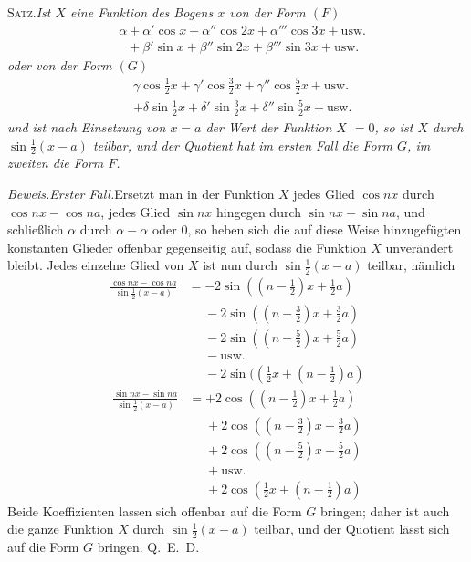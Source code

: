 \begingroup
\renewcommand{\arraystretch}{1.45}
\textsc{Satz.}\quad\textit{Ist $X$ eine Funktion des Bogens $x$ von der Form $(F)$}
\[
\begin{aligned}
&\alpha+\alpha'\cos x+\alpha''\cos 2x+\alpha'''\cos 3x+\text{usw.}\\[5pt]
&\phantom{\alpha}+\beta'\sin x+\beta''\sin 2x+\beta'''\sin 3x+\text{usw.}
\end{aligned}
\]
\textit{oder von der Form $(G)$}
\[
\begin{aligned}
&\gamma\cos\tfrac12x+\gamma'\cos\tfrac32x+\gamma''\cos\tfrac52x+\text{usw.}\\[5pt]
&+\delta\sin\tfrac12x+\delta'\sin\tfrac32x+\delta''\sin\tfrac52x+\text{usw.}
\end{aligned}
\]
\textit{und ist nach Einsetzung von $x=a$ der Wert der Funktion $X$ $=0$, so ist $X$ durch $\sin\tfrac12(x-a)$ teilbar, und der Quotient hat im ersten Fall die Form $G$, im zweiten die Form $F$.}

\textit{Beweis.\quad Erster Fall.}\quad Ersetzt man in der Funktion $X$ jedes Glied $\cos nx$ durch $\cos nx-\cos na$, jedes Glied $\sin nx$ hingegen durch $\sin nx-\sin na$,
und schließlich $\alpha$ durch $\alpha-\alpha$ oder $0$, so heben sich die auf diese Weise hinzugefügten konstanten Glieder offenbar gegenseitig auf, sodass die Funktion $X$ unverändert bleibt. Jedes einzelne Glied von $X$ ist nun durch $\sin\tfrac12(x-a)$ teilbar, nämlich
\[
\begin{aligned}
\frac{\cos nx-\cos na}{\sin\tfrac12(x-a)}
&=-2\sin((n-\tfrac12)x+\tfrac12a)\\[5pt]
&\phantom{=}{-}2\sin((n-\tfrac32)x+\tfrac32a)\\[5pt]
&\phantom{=}{-}2\sin((n-\tfrac52)x+\tfrac52a)\\[5pt]
&\phantom{=}{-}\text{usw.}\\[5pt]
&\phantom{=}{-}2\sin((\tfrac12x+(n-\tfrac12)a)
\end{aligned}
\]
\[
\begin{aligned}
\frac{\sin nx-\sin na}{\sin\tfrac12(x-a)}
&=+2\cos((n-\tfrac12)x+\tfrac12a)\\[5pt]
&\phantom{=}{+}2\cos((n-\tfrac32)x+\tfrac32a)\\[5pt]
&\phantom{=}{+}2\cos((n-\tfrac52)x-\tfrac52a)\\[5pt]
&\phantom{=}{+}\text{usw.}\\[5pt]
&\phantom{=}{+}2\cos(\tfrac12x+(n-\tfrac12)a)
\end{aligned}
\]
Beide Koeffizienten lassen sich offenbar auf die Form $G$ bringen; daher ist auch die ganze Funktion $X$ durch $\sin\tfrac12(x-a)$ teilbar, und der Quotient lässt sich auf die Form $G$ bringen. Q.~E.~D.

